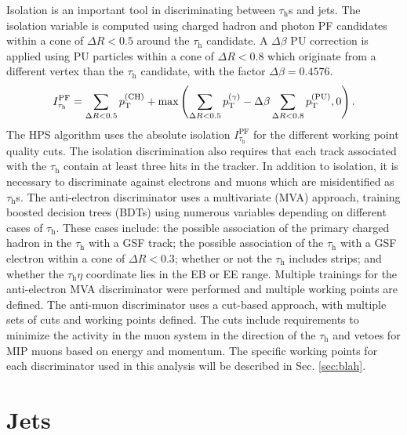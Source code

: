 \documentclass[12pt]{thesis}  %
\newcommand{\tauh}{\ensuremath{\tau_{\text{h}}}\xspace}
\begin{document}
Isolation is an important tool in discriminating between $\tauh$s and jets. The isolation variable is computed using charged hadron and photon PF candidates within a cone of $\Delta R < 0.5$ around the \tauh candidate. A $\Delta\beta$ PU correction is applied using PU particles within a cone of $\Delta R < 0.8$ which originate from a different vertex than the \tauh candidate, with the factor $\Delta\beta = 0.4576$.
\begin{equation}
I^{\text{PF}}_{\tauh} = \sum_{\Delta R < 0.5}{\pt^{(\text{CH})}} + \text{max}\left( \sum_{\Delta R < 0.5}{\pt^{(\gamma)}} - \Delta\beta \sum_{\Delta R < 0.8}{\pt^{(\text{PU})}}, 0 \right).
\end{equation}
The HPS algorithm uses the absolute isolation $I^{\text{PF}}_{\tauh}$ for the different working point quality cuts. The isolation discrimination also requires that each track associated with the \tauh contain at least three hits in the tracker. In addition to isolation, it is necessary to discriminate against electrons and muons which are misidentified as $\tauh$s. The anti-electron discriminator uses a multivariate (MVA) approach, training boosted decision trees (BDTs) using numerous variables depending on different cases of \tauh. These cases include: the possible association of the primary charged hadron in the \tauh with a GSF track; the possible association of the \tauh with a GSF electron within a cone of $\Delta R < 0.3$; whether or not the \tauh includes strips; and whether the \tauh $\eta$ coordinate lies in the EB or EE range. Multiple trainings for the anti-electron MVA discriminator were performed and multiple working points are defined. The anti-muon discriminator uses a cut-based approach, with multiple sets of cuts and working points defined. The cuts include requirements to minimize the activity in the muon system in the direction of the \tauh and vetoes for MIP muons based on energy and momentum. The specific working points for each discriminator used in this analysis will be described in Sec. \ref{sec:blah}.

\section{Jets}
\end{document}
